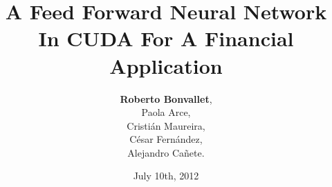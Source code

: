 \documentclass{beamer}
\author[R.\@Bonvallet et al]{\large
  \textbf{Roberto Bonvallet},\\
  Paola Arce,\\
  Cristián Maureira,\\
  César Fernández,\\
  Alejandro Cañete.
}
\title{\Large
  A Feed Forward Neural Network In CUDA For A Financial Application
}
\date{July 10th, 2012}
\begin{document}
\begin{frame}[t,plain]
\titlepage
\end{frame}

\begin{frame}[t,plain]
\titlepage
\end{frame}
\end{document}
